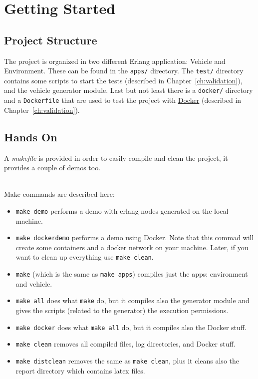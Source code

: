 \documentclass{memoir}
\begin{document}
\section{Getting Started}
\subsection{Project Structure}
The project is organized in two different Erlang application: Vehicle and Environment. These can be found in the \verb|apps/| directory. The \verb|test/| directory contains some scripts to start the tests (described in Chapter~\ref{ch:validation}), and the vehicle generator module. Last but not least there is a \verb|docker/| directory and a \verb|Dockerfile| that are used to test the project with \href{https://www.docker.com/}{Docker} (described in Chapter~\ref{ch:validation}).

\subsection{Hands On}
A \emph{makefile} is provided in order to easily compile and clean the project, it provides a couple of demos too.

\noindent
\\
Make commands are described here:
\begin{itemize}
	\item \verb|make demo| performs a demo with erlang nodes generated on the local machine.
	\item \verb|make dockerdemo| performs a demo using Docker. Note that this commad will create some containers and a docker network on your machine. Later, if you want to clean up everything use \verb|make clean|.
	\item \verb|make| (which is the same as \verb|make apps|) compiles just the apps: environment and vehicle.
	\item \verb|make all| does what \verb|make| do, but it compiles also the generator module and gives the scripts (related to the generator) the execution permissions.
	\item \verb|make docker| does what \verb|make all| do, but it compiles also the Docker stuff.
	\item  \verb|make clean| removes all compiled files, log directories, and Docker stuff.
	\item  \verb|make distclean| removes the same as \verb|make clean|, plus it cleans also the report directory which contains latex files.
\end{itemize}
\end{document}
